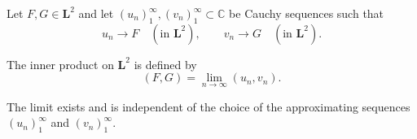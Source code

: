 Let $F, G \in \mathbf{L}^2$ and let $(u_n)_{1}^{\infty}, (v_n)_{1}^{\infty} \subset \mathbb{C}$ be Cauchy sequences such that
$$
u_n \to F \quad (\text{in } \mathbf{L}^2), \qquad v_n \to G \quad (\text{in } \mathbf{L}^2).
$$

The inner product on $\mathbf{L}^2$ is defined by
$$
(F, G) = \lim_{n \to \infty} (u_n, v_n).
$$

The limit exists and is independent of the choice of the approximating sequences $(u_n)_{1}^{\infty}$ and $(v_n)_{1}^{\infty}$.
